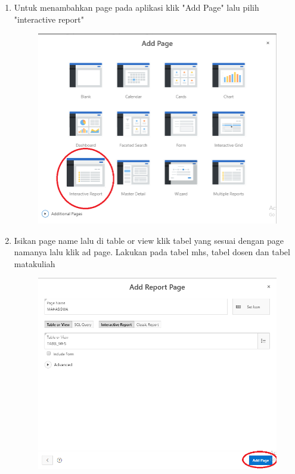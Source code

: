 \begin{enumerate}
	\item Untuk menambahkan page pada aplikasi klik "Add Page" lalu pilih "interactive report"
	\begin{figure} [!htbp]
	\includegraphics[scale=0.2]{Apex/24.png}
	\centering
	\end{figure}
	
	\item Isikan page name lalu di table or view klik tabel yang sesuai dengan page namanya lalu klik ad page. Lakukan pada tabel mhs, tabel dosen dan tabel matakuliah 
	\begin{figure} [!htbp]
	\includegraphics[scale=0.2]{Apex/25.png}
	\centering
	\end{figure}
	

\end{enumerate}
